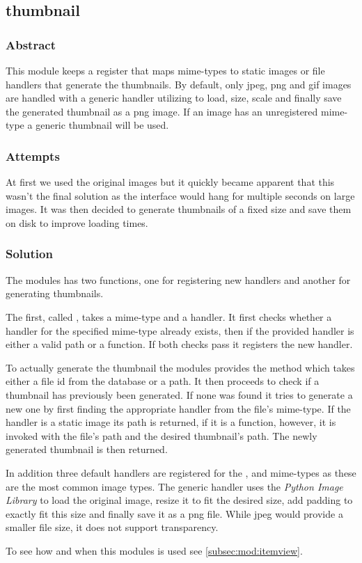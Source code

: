 \subsection{thumbnail}%
\label{sub:mod:thumbnail}
\def\kapitelautor{Clemens Stadlbauer}

\subsubsection{Abstract}

This module keeps a register that maps mime-types to static images or file
handlers that generate the thumbnails. By default, only jpeg, png and gif
images are handled with a generic handler utilizing  to
load, size, scale and finally save the generated thumbnail as a png image. If
an image has an unregistered mime-type a generic thumbnail will be used.

\subsubsection{Attempts}

At first we used the original images but it quickly became apparent that this
wasn't the final solution as the interface would hang for multiple seconds on
large images. It was then decided to generate thumbnails of a fixed size and
save them on disk to improve loading times.

\subsubsection{Solution} %

The modules has two functions, one for registering new handlers and another for
generating thumbnails.

The first, called , takes a mime-type and a handler. It first
checks whether a handler for the specified mime-type already exists, then if
the provided handler is either a valid path or a function. If both checks pass
it registers the new handler.

To actually generate the thumbnail the modules provides the
 method which takes either a file id from the database or
a path. It then proceeds to check if a thumbnail has previously been generated.
If none was found it tries to generate a new one by first finding the
appropriate handler from the file's mime-type. If the handler is a static image
its path is returned, if it is a function, however, it is invoked with the
file's path and the desired thumbnail's path. The newly generated thumbnail is
then returned.

In addition three default handlers are registered for the ,
 and  mime-types as these are the most
common image types. The generic handler uses the \emph{Python Image
Library} to load the original image, resize it to fit the desired
size, add padding to exactly fit this size and finally save it as a png file.
While jpeg would provide a smaller file size, it does not support transparency.

To see how and when this modules is used see \cref{subsec:mod:itemview}.
